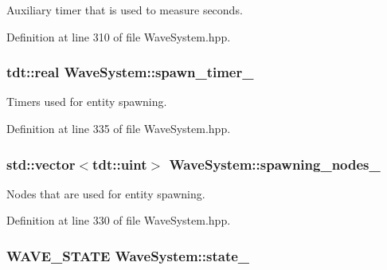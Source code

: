Auxiliary timer that is used to measure seconds. 



Definition at line 310 of file Wave\+System.\+hpp.

\subsubsection[{\texorpdfstring{spawn\+\_\+timer\+\_\+}{spawn_timer_}}]{\setlength{\rightskip}{0pt plus 5cm}tdt\+::real Wave\+System\+::spawn\+\_\+timer\+\_\+\hspace{0.3cm}{\ttfamily [private]}}\hypertarget{class_wave_system_ada44d4ac39d896951051bb1e983a0f1b}{}\label{class_wave_system_ada44d4ac39d896951051bb1e983a0f1b}


Timers used for entity spawning. 



Definition at line 335 of file Wave\+System.\+hpp.

\subsubsection[{\texorpdfstring{spawning\+\_\+nodes\+\_\+}{spawning_nodes_}}]{\setlength{\rightskip}{0pt plus 5cm}std\+::vector$<$tdt\+::uint$>$ Wave\+System\+::spawning\+\_\+nodes\+\_\+\hspace{0.3cm}{\ttfamily [private]}}\hypertarget{class_wave_system_a28ea2af56b6debb00a1fd780b8ace530}{}\label{class_wave_system_a28ea2af56b6debb00a1fd780b8ace530}


Nodes that are used for entity spawning. 



Definition at line 330 of file Wave\+System.\+hpp.

\subsubsection[{\texorpdfstring{state\+\_\+}{state_}}]{\setlength{\rightskip}{0pt plus 5cm}W\+A\+V\+E\+\_\+\+S\+T\+A\+TE Wave\+System\+::state\+\_\+\hspace{0.3cm}{\ttfamily [private]}}\hypertarget{class_wave_system_add90dfd41a5917d398623fcea26fb269}{}\label{class_wave_system_add90dfd41a5917d398623fcea26fb269}


